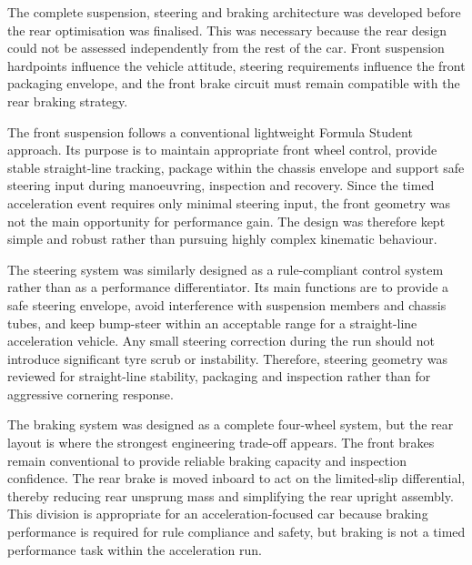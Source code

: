 The complete suspension, steering and braking architecture was developed before the rear optimisation was finalised. This was necessary because the rear design could not be assessed independently from the rest of the car. Front suspension hardpoints influence the vehicle attitude, steering requirements influence the front packaging envelope, and the front brake circuit must remain compatible with the rear braking strategy.

The front suspension follows a conventional lightweight Formula Student approach. Its purpose is to maintain appropriate front wheel control, provide stable straight-line tracking, package within the chassis envelope and support safe steering input during manoeuvring, inspection and recovery. Since the timed acceleration event requires only minimal steering input, the front geometry was not the main opportunity for performance gain. The design was therefore kept simple and robust rather than pursuing highly complex kinematic behaviour.

The steering system was similarly designed as a rule-compliant control system rather than as a performance differentiator. Its main functions are to provide a safe steering envelope, avoid interference with suspension members and chassis tubes, and keep bump-steer within an acceptable range for a straight-line acceleration vehicle. Any small steering correction during the run should not introduce significant tyre scrub or instability. Therefore, steering geometry was reviewed for straight-line stability, packaging and inspection rather than for aggressive cornering response.

The braking system was designed as a complete four-wheel system, but the rear layout is where the strongest engineering trade-off appears. The front brakes remain conventional to provide reliable braking capacity and inspection confidence. The rear brake is moved inboard to act on the limited-slip differential, thereby reducing rear unsprung mass and simplifying the rear upright assembly. This division is appropriate for an acceleration-focused car because braking performance is required for rule compliance and safety, but braking is not a timed performance task within the acceleration run.


